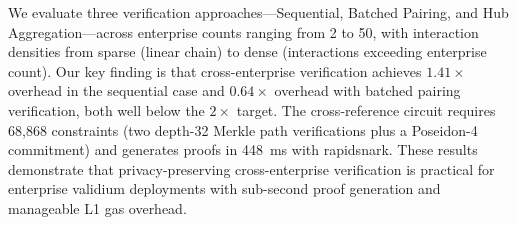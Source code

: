 We evaluate three verification approaches---Sequential, Batched Pairing, and
Hub Aggregation---across enterprise counts ranging from 2 to 50, with
interaction densities from sparse (linear chain) to dense (interactions
exceeding enterprise count). Our key finding is that cross-enterprise
verification achieves $1.41\times$ overhead in the sequential case and
$0.64\times$ overhead with batched pairing verification, both well below the
$2\times$ target. The cross-reference circuit requires 68,868 constraints
(two depth-32 Merkle path verifications plus a Poseidon-4 commitment) and
generates proofs in 448~ms with rapidsnark. These results demonstrate that
privacy-preserving cross-enterprise verification is practical for
enterprise validium deployments with sub-second proof generation and
manageable L1 gas overhead.
